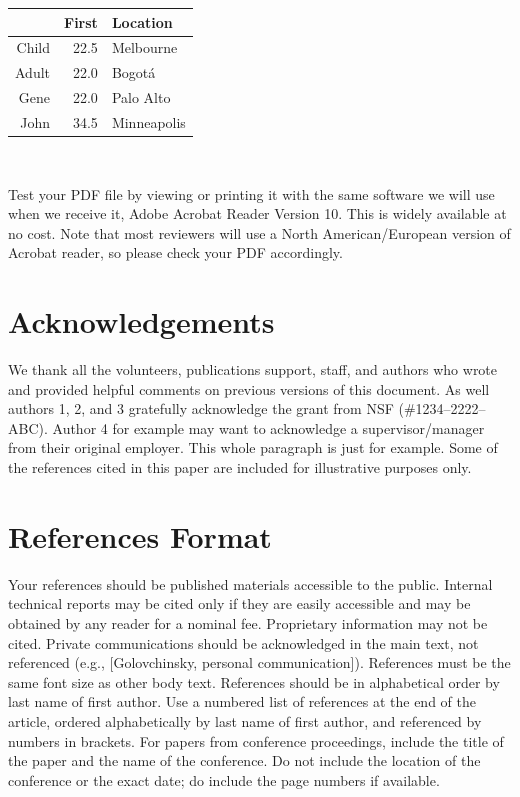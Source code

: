 \documentclass{sigchi-ext}
\begin{document}
\begin{margintable}[1pc]
  \begin{minipage}{\marginparwidth}
    \centering
    \begin{tabular}{r r l}
      & {\small \textbf{First}}
      & {\small \textbf{Location}} \\
      \toprule
      Child & 22.5 & Melbourne \\
      Adult & 22.0 & Bogot\'a \\
      \midrule
      Gene & 22.0 & Palo Alto \\
      John & 34.5 & Minneapolis \\
      \bottomrule
    \end{tabular}
    \caption{A simple narrow table in the left margin
      space.}~\label{tab:table2}
  \end{minipage}
\end{margintable}
Test your PDF file by viewing or printing it with the same software we
will use when we receive it, Adobe Acrobat Reader Version 10. This is
widely available at no cost. Note that most
reviewers will use a North American/European version of Acrobat
reader, so please check your PDF accordingly.

\section{Acknowledgements}
We thank all the volunteers, publications support, staff, and authors
who wrote and provided helpful comments on previous versions of this
document. As well authors 1, 2, and 3 gratefully acknowledge the grant
from NSF (\#1234--2222--ABC). Author 4 for example may want to
acknowledge a supervisor/manager from their original employer. This
whole paragraph is just for example. Some of the references cited in
this paper are included for illustrative purposes only.

\section{References Format}
Your references should be published materials accessible to the
public. Internal technical reports may be cited only if they are
easily accessible and may be obtained by any reader for a nominal
fee. Proprietary information may not be cited. Private communications
should be acknowledged in the main text, not referenced (e.g.,
[Golovchinsky, personal communication]). References must be the same
font size as other body text. References should be in alphabetical
order by last name of first author. Use a numbered list of references
at the end of the article, ordered alphabetically by last name of
first author, and referenced by numbers in brackets. For papers from
conference proceedings, include the title of the paper and the name of
the conference. Do not include the location of the conference or the
exact date; do include the page numbers if available. 
\end{document}
